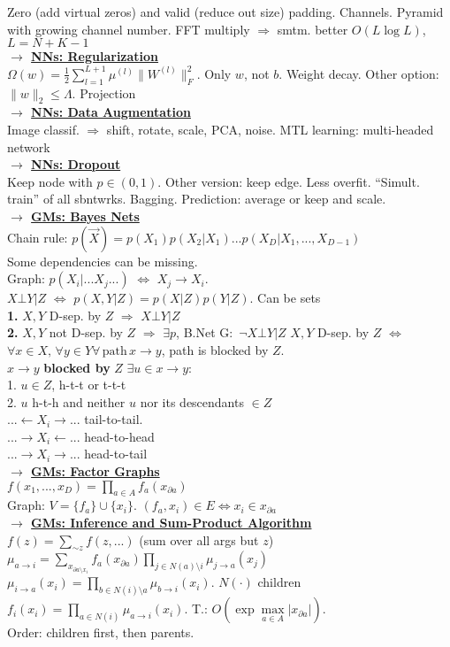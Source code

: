 \documentclass[12pt]{article}
\newcommand{\mytitle}[1]{ {\bf $\rightarrow$ \underline{#1}}\\}
\begin{document}
\begin{multicols*}{2}
Zero (add virtual zeros) and valid (reduce out size) padding.
Channels. Pyramid with growing channel number.
FFT multiply $\Rightarrow$ smtm. better $O(L\log L)$, $L=N+K-1$\\
\mytitle{NNs: Regularization}
$\Omega(w)=\frac{1}{2}\sum\limits_{l=1}^{L+1}\mu^{(l)}\|W^{(l)}\|_F^2$.
Only $w$, not $b$. Weight decay.
Other option: $\|w\|_2\leqslant \Lambda$. Projection\\
\mytitle{NNs: Data Augmentation}
Image classif. $\Rightarrow$ shift, rotate, scale, PCA, noise.
MTL learning: multi-headed network\\
\mytitle{NNs: Dropout}
Keep node with $p\in(0,1)$. Other version: keep edge.
Less overfit. ``Simult. train'' of all sbntwrks. Bagging.
Prediction: average or keep and scale.\\
\mytitle{GMs: Bayes Nets}
Chain rule: $p(\vec{X})=p(X_1)p(X_2|X_1)...p(X_D|X_1,...,X_{D-1})$\\
Some dependencies can be missing.\\
Graph: $p(X_i|...X_j...)$ $\Leftrightarrow$ $X_j\to X_i$.\\
$X\bot Y|Z$ $\Leftrightarrow$ $p(X, Y|Z)=p(X|Z)p(Y|Z)$. Can be sets\\
{\bf 1.} $X, Y$ D-sep. by $Z$ $\Rightarrow$ $X\bot Y|Z$\\
{\bf 2.} $X, Y$ not D-sep. by $Z$ $\Rightarrow$ $\exists p$, B.Net G$\colon$ $\neg X\bot Y|Z$
$X,Y$ D-sep. by $Z$ $\Leftrightarrow$ $\forall x\in X,\,\forall y\in Y \forall\, \mbox{path}\, x\to y$, path is blocked by $Z$.\\$x\to y$ {\bf blocked by} $Z$ $\exists u\in x\to y\colon$\\
1. $u\in Z$, h-t-t or t-t-t\\
2. $u$ h-t-h and neither $u$ nor its descendants $\in Z$\\
$...\leftarrow X_i\rightarrow...$ tail-to-tail.\\
$...\rightarrow X_i\leftarrow...$ head-to-head\\
$...\rightarrow X_i\rightarrow...$ head-to-tail\\
\mytitle{GMs: Factor Graphs}
$f(x_1,...,x_D)=\prod\limits_{a\in A}f_a(x_{\partial a})$\\
Graph: $V=\{f_a\}\cup\{x_i\}$. $(f_a,x_i)\in E\Leftrightarrow x_i\in x_{\partial a}$\\
\mytitle{GMs: Inference and Sum-Product Algorithm}
$f(z)=\sum\limits_{\sim z}f(z,...)$ (sum over all args but $z$)\\
$\mu_{a\to i}=\sum\limits_{x_{\partial a\setminus x_i}}f_a(x_{\partial a})\prod\limits_{j\in N(a)\setminus i}\mu_{j\to a}(x_j)$\\
$\mu_{i\to a}(x_i)=\prod\limits_{b\in N(i)\setminus a}\mu_{b\to i}(x_i)$. $N(\cdot )$ children\\
$f_i(x_i)=\prod\limits_{a\in N(i)}\mu_{a\to i}(x_i)$.
T.: $O\left(\exp \max\limits_{a\in A}|x_{\partial a}|\right)$.\\
Order: children first, then parents.
\end{multicols*}
\end{document}
